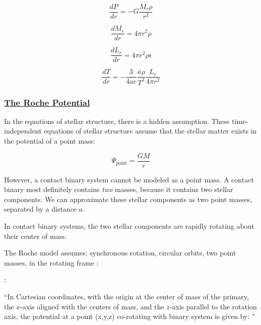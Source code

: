 \documentclass[12pt]{article} %
\numberwithin{equation}{section} %
\begin{document}
\begin{equation} \label{stellar_structure1}
\frac{dP}{dr} = -G \frac{M_{r} \rho}{r^{2}} 
\end{equation}

\begin{equation} \label{stellar_structure2}
\frac{dM_{r}}{dr} = 4 \pi r^{2} \rho
\end{equation}

\begin{equation} \label{stellar_structure3}
\frac{dL_{r}}{dr} = 4 \pi r^{2} \rho \epsilon
\end{equation}

\begin{equation} \label{stellar_structure4}
\frac{dT}{dr} = - \frac{3}{4ac} \frac{\bar{\kappa} \rho}{T^{3}} \frac{L_{r}}{4 \pi r^{2}}
\end{equation}

\subsubsection[The Roche Potential]{\hyperlink{toc}{The Roche Potential}} \label{sec: The Roche Potential}

In the equations of stellar structure, there is a hidden assumption. These time-independent equations of stellar structure assume that the stellar matter exists in the potential of a point mass:

\begin{equation} \label{point_mass}
\Psi_{\text{point}} = \frac{GM}{r}
\end{equation}

However, a contact binary system cannot be modeled as a point mass. A contact binary most definitely contains \emph{two} masses, because it contains two stellar components. We can approximate these stellar components as two point masses, separated by a distance $a$.

In contact binary systems, the two stellar components are rapidly rotating about their center of mass.


The Roche model assumes: synchronous rotation, circular orbits, two point masses, in the rotating frame \citep{kopal1959close} :

\citet{mochnacki1984accurate}:

``In Cartesian coordinates, with the origin at the center of mass of the primary, the $x$-axis aligned with the centers of mass, and the $z$-axis parallel to the rotation axis, the potential at a point (x,y,z) co-rotating with binary system is given by: "
\end{document}
